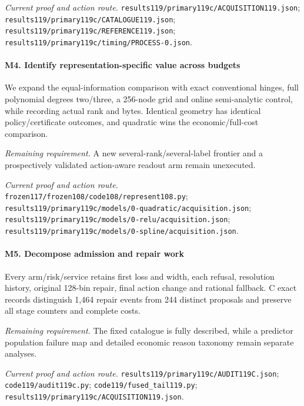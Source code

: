 \par\emph{Current proof and action route.} \nolinkurl{results119/primary119c/ACQUISITION119.json}; \nolinkurl{results119/primary119c/CATALOGUE119.json}; \nolinkurl{results119/primary119c/REFERENCE119.json}; \nolinkurl{results119/primary119c/timing/PROCESS-0.json}.

\paragraph{M4. Identify representation-specific value across budgets}

We expand the equal-information comparison with exact conventional hinges, full polynomial degrees two/\allowbreak{}three, a 256-node grid and online semi-analytic control, while recording actual rank and bytes. Identical geometry has identical policy/\allowbreak{}certificate outcomes, and quadratic wins the economic/\allowbreak{}full-cost comparison.

\par\emph{Remaining requirement.} A new several-rank/\allowbreak{}several-label frontier and a prospectively validated action-aware readout arm remain unexecuted.

\par\emph{Current proof and action route.} \nolinkurl{frozen117/frozen108/code108/represent108.py}; \nolinkurl{results119/primary119c/models/0-quadratic/acquisition.json}; \nolinkurl{results119/primary119c/models/0-relu/acquisition.json}; \nolinkurl{results119/primary119c/models/0-spline/acquisition.json}.

\paragraph{M5. Decompose admission and repair work}

Every arm/\allowbreak{}risk/\allowbreak{}service retains first loss and width, each refusal, resolution history, original 128-bin repair, final action change and rational fallback. C exact records distinguish 1,464 repair events from 244 distinct proposals and preserve all stage counters and complete costs.

\par\emph{Remaining requirement.} The fixed catalogue is fully described, while a predictor population failure map and detailed economic reason taxonomy remain separate analyses.

\par\emph{Current proof and action route.} \nolinkurl{results119/primary119c/AUDIT119C.json}; \nolinkurl{code119/audit119c.py}; \nolinkurl{code119/fused_tail119.py}; \nolinkurl{results119/primary119c/ACQUISITION119.json}.

